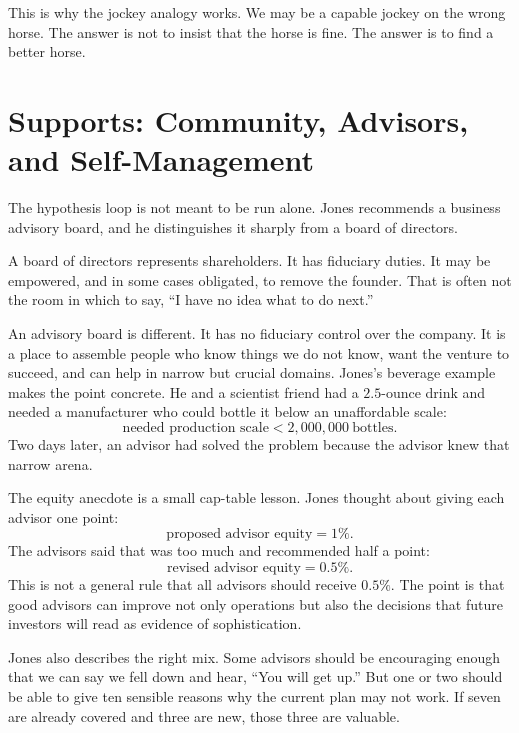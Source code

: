 This is why the jockey analogy works. We may be a capable jockey on the wrong horse. The answer is not to insist that the horse is fine. The answer is to find a better horse.

\section{Supports: Community, Advisors, and Self-Management}

The hypothesis loop is not meant to be run alone. Jones recommends a business advisory board, and he distinguishes it sharply from a board of directors.

A board of directors represents shareholders. It has fiduciary duties. It may be empowered, and in some cases obligated, to remove the founder. That is often not the room in which to say, ``I have no idea what to do next.''

An advisory board is different. It has no fiduciary control over the company. It is a place to assemble people who know things we do not know, want the venture to succeed, and can help in narrow but crucial domains. Jones's beverage example makes the point concrete. He and a scientist friend had a \(2.5\)-ounce drink and needed a manufacturer who could bottle it below an unaffordable scale:
\begin{equation}
\text{needed production scale}<2{,}000{,}000\ \text{bottles}.
\end{equation}
Two days later, an advisor had solved the problem because the advisor knew that narrow arena.

The equity anecdote is a small cap-table lesson. Jones thought about giving each advisor one point:
\begin{equation}
\text{proposed advisor equity}=1\%.
\end{equation}
The advisors said that was too much and recommended half a point:
\begin{equation}
\text{revised advisor equity}=0.5\%.
\end{equation}
This is not a general rule that all advisors should receive \(0.5\%\). The point is that good advisors can improve not only operations but also the decisions that future investors will read as evidence of sophistication.

Jones also describes the right mix. Some advisors should be encouraging enough that we can say we fell down and hear, ``You will get up.'' But one or two should be able to give ten sensible reasons why the current plan may not work. If seven are already covered and three are new, those three are valuable.

